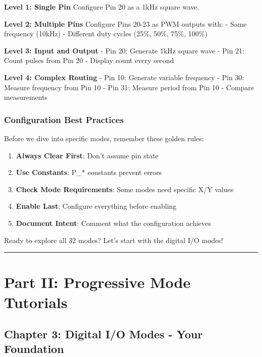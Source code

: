 \documentclass[11pt,a4paper,oneside,english]{book}
\begin{document}
\textbf{Level 1: Single Pin} Configure Pin 20 as a 1kHz square wave.

\textbf{Level 2: Multiple Pins} Configure Pins 20-23 as PWM outputs
with: - Same frequency (10kHz) - Different duty cycles (25\%, 50\%,
75\%, 100\%)

\textbf{Level 3: Input and Output} - Pin 20: Generate 1kHz square wave -
Pin 21: Count pulses from Pin 20 - Display count every second

\textbf{Level 4: Complex Routing} - Pin 10: Generate variable frequency
- Pin 30: Measure frequency from Pin 10 - Pin 31: Measure period from
Pin 10 - Compare measurements

\hypertarget{configuration-best-practices}{%
\section{Configuration Best
Practices}\label{configuration-best-practices}}

Before we dive into specific modes, remember these golden rules:

\begin{enumerate}
\def\labelenumi{\arabic{enumi}.}
\tightlist
\item
  \textbf{Always Clear First}: Don't assume pin state
\item
  \textbf{Use Constants}: P\_* constants prevent errors
\item
  \textbf{Check Mode Requirements}: Some modes need specific X/Y values
\item
  \textbf{Enable Last}: Configure everything before enabling
\item
  \textbf{Document Intent}: Comment what the configuration achieves
\end{enumerate}

Ready to explore all 32 modes? Let's start with the digital I/O modes!

\begin{center}\rule{0.5\linewidth}{0.5pt}\end{center}

\clearpage

\clearpage

\hypertarget{part-ii-progressive-mode-tutorials}{%
\part{Part II: Progressive Mode
Tutorials}\label{part-ii-progressive-mode-tutorials}}

\hypertarget{chapter-3-digital-io-modes---your-foundation}{%
\chapter{Chapter 3: Digital I/O Modes - Your
Foundation}\label{chapter-3-digital-io-modes---your-foundation}}
\end{document}
